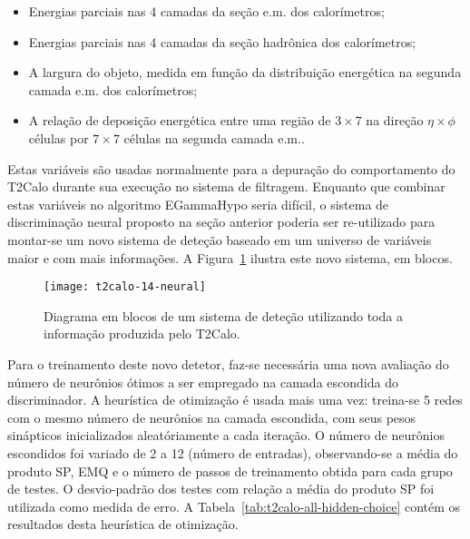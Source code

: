 \begin{itemize}
\item Energias parciais nas 4 camadas da seção e.m. dos calorímetros;
\item Energias parciais nas 4 camadas da seção hadrônica dos calorímetros;
\item A largura do objeto, medida em função da distribuição energética na
segunda camada e.m. dos calorímetros;
\item A relação de deposição energética entre uma região de $3\times7$ na
direção $\eta\times\phi$ células por $7\times7$ células na segunda camada e.m..
\end{itemize}

Estas variáveis são usadas normalmente  para a depuração do
comportamento do T2Calo durante sua execução no sistema de filtragem. Enquanto
que combinar estas variáveis no algoritmo EGammaHypo seria difícil, o sistema
de discriminação neural proposto na seção anterior poderia ser re-utilizado
para montar-se um novo sistema de deteção baseado em um universo de variáveis
maior e com mais informações. A Figura~\ref{fig:t2calo-14-neural} ilustra este
novo sistema, em blocos.

\begin{figure}
\begin{center}
\texttt{[image: t2calo-14-neural]}
\end{center}
\caption{Diagrama em blocos de um sistema de deteção utilizando toda a
informação produzida pelo T2Calo.}
\label{fig:t2calo-14-neural}
\end{figure}

Para o treinamento deste novo detetor, faz-se necessária uma nova avaliação do
número de neurônios ótimos a ser empregado na camada escondida do
discriminador. A heurística de otimização é usada mais uma vez: treina-se 5
redes com o mesmo número de neurônios na camada escondida, com seus pesos
sinápticos inicializados aleatóriamente a cada iteração. O número de neurônios
escondidos foi variado de 2 a 12 (número de entradas), observando-se a média
do produto SP, EMQ e o número de passos de treinamento obtida para cada grupo
de testes. O desvio-padrão dos testes com relação a média do produto SP foi
utilizada como medida de erro. A Tabela~\ref{tab:t2calo-all-hidden-choice}
contém os resultados desta heurística de otimização.

